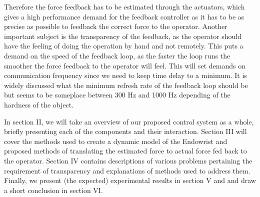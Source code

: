 Therefore the force feedback has to be estimated through the actuators, which gives a high performance demand for the feedback controller as it has to be as precise as possible to feedback the correct force to the operator. Another important subject is the transparency of the feedback, as the operator should have the feeling of doing the operation by hand and not remotely. This puts a demand on the speed of the feedback loop, as the faster the loop runs the smoother the force feedback to the operator will feel. This will set demands on communication frequency since we need to keep time delay to a minimum. It is widely discussed what the minimum refresh rate of the feedback loop should be but seems to be someplace between 300 Hz and 1000 Hz depending of the hardness of the object\cite{coles2011role}.

In section II, we will take an overview of our proposed control system as a whole, briefly presenting each of the components and their interaction.
Section III will cover the methods used to create a dynamic model of the Endowrist and proposed methods of translating the estimated force to actual force fed back to the operator.
Section IV contains descriptions of various problems pertaining the requirement of transparency and explanations of methods used to address them.
Finally,  we present (the expected) experimental results in section V and and draw a short conclusion in section VI.






